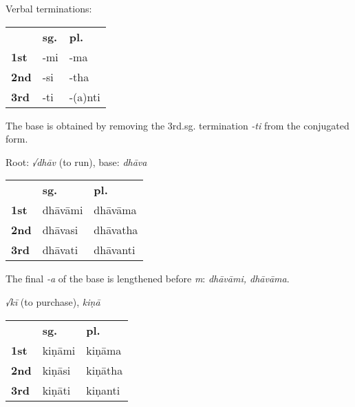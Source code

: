\documentclass[11pt,oneside]{memoir}
\begin{document}
{\centering\par
\begin{multicols}{2}

Verbal terminations:

\begin{center}
\begin{tabular}{lll}
 & \textbf{sg.} & \textbf{pl.}\\[0pt]
\textbf{1st} & -mi & -ma\\[0pt]
\textbf{2nd} & -si & -tha\\[0pt]
\textbf{3rd} & -ti & -(a)nti\\[0pt]
\end{tabular}
\end{center}

The base is obtained by removing the 3rd.sg. termination \emph{-ti} from the conjugated form.

\columnbreak

Root: \emph{√dhāv} (to run), base: \emph{dhāva}

\begin{center}
\begin{tabular}{lll}
 & \textbf{sg.} & \textbf{pl.}\\[0pt]
\textbf{1st} & dhāvāmi & dhāvāma\\[0pt]
\textbf{2nd} & dhāvasi & dhāvatha\\[0pt]
\textbf{3rd} & dhāvati & dhāvanti\\[0pt]
\end{tabular}
\end{center}

The final \emph{-a} of the base is lengthened before \emph{m}: \emph{dhāvāmi, dhāvāma}.

\end{multicols}

\begin{multicols}{3}

\emph{√kī} (to purchase), \emph{kiṇā}

\begin{center}
\begin{tabular}{lll}
 & \textbf{sg.} & \textbf{pl.}\\[0pt]
\textbf{1st} & kiṇāmi & kiṇāma\\[0pt]
\textbf{2nd} & kiṇāsi & kiṇātha\\[0pt]
\textbf{3rd} & kiṇāti & kiṇanti\\[0pt]
\end{tabular}
\end{center}


\end{multicols}}
\end{document}
